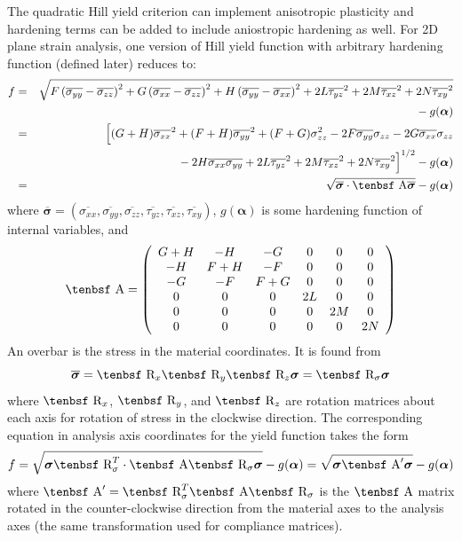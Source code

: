 \documentclass[11pt]{article}
\renewcommand{\vec}[1]{\boldsymbol{#1}}
\def\A{\hbox{\tenbsf A}}
\def\R{\hbox{\tenbsf R}}
\def\s#1{\sigma_{#1}}
\def\t#1{\tau_{#1}}
\begin{document}
The quadratic Hill yield criterion can implement anisotropic plasticity and hardening terms can be added to include aniostropic hardening as well. For 2D plane strain analysis, one version of Hill yield function with arbitrary hardening function (defined later) reduces to:
\begin{eqnarray}
          f & = & \sqrt{F\left(\overline{\s{yy}}- \overline{\s{zz}}\right)^2 + G\left(\overline{\s{xx}}- \overline{\s{zz}}\right)^2
               + H\left(\overline{\s{yy}}- \overline{\s{xx}}\right)^2 +2L\overline{\t{yz}}^2 +2M\overline{\t{xz}}^2
                 +2N\overline{\t{xy}}^2}
  \nonumber\\
 &&\qquad\mbox{}
                 - g(\vec\alpha) \\
             & = & \Bigl[(G+H)\overline{\s{xx}}^2  + (F+H)\overline{\s{yy}}^2 + (F+G)\s{zz}^2
                   -2F \overline{\s{yy}}\s{zz} - 2G \overline{\s{xx}}\s{zz}
 \nonumber\\
 &&\qquad\mbox{}
                    - 2H \overline{\s{xx}}\overline{\s{yy}}
                   +2L\overline{\t{yz}}^2 +2M\overline{\t{xz}}^2+2N\overline{\t{xy}}^2\Bigr]^{1/2}  - g(\vec\alpha) \\
             & = & \sqrt{\overline{\vec\sigma} \cdot \A \overline{\vec\sigma}} - g(\vec\alpha)       \label{froteq}
\end{eqnarray}
where $\overline{\vec\sigma} = (\overline{\s{xx}}, \overline{\s{yy}}, \overline{\s{zz}}, \overline{\t{yz}}, \overline{\t{xz}}, \overline{\t{xy}})$, $g(\vec\alpha)$ is some hardening function of internal variables, and
\begin{equation}
      \A = \left( \begin{array}{cccccc}
                       G+H & -H & -G & 0 & 0 & 0 \\
                       -H & F+H & -F & 0 & 0 & 0\\
                       -G & -F & F+G & 0 & 0 & 0\\
                        0 & 0 & 0 & 2L & 0 & 0 \\
                       0 & 0 & 0 & 0 & 2M & 0 \\
                      0 & 0 & 0 & 0 & 0 & 2N
                       \end{array} \right)
\end{equation}
An overbar is the stress in the material coordinates. It is found from
\begin{equation}
     \overline{\vec\sigma} = \R_x\R_y\R_z\vec\sigma = \R_\sigma\vec\sigma
\end{equation}
where $\R_x$, $\R_y$, and $\R_z$ are rotation matrices about each axis for rotation of stress in the clockwise direction.
The corresponding equation in analysis axis coordinates for the yield function takes the form
\begin{equation}
     f = \sqrt{\vec\sigma \R_\sigma^T\cdot \A \R_\sigma\vec\sigma} - g(\vec\alpha) = \sqrt{\vec\sigma \A' \vec\sigma} - g(\vec\alpha)     \label{fanaleq}
\end{equation}
where $\A' = \R_\sigma^T\A\R_\sigma$ is the $\A$ matrix rotated in the counter-clockwise direction from the material axes to the analysis axes (the same transformation used for compliance matrices).
\end{document}
